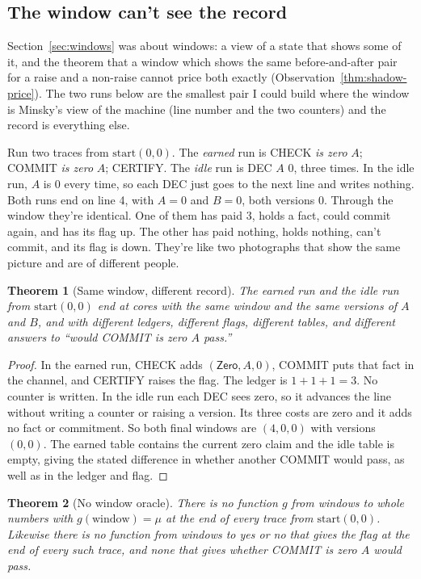 \documentclass[11pt,twoside]{article}
\theoremstyle{thielethm}
\newtheorem{theorem}{Theorem}[section]
\theoremstyle{thieledef}
\theoremstyle{thieledef}
\theoremstyle{thieledef}
\theoremstyle{thielethm}
\theoremstyle{thieleobs}
\theoremstyle{thielethm}
\begin{document}
\subsection{The window can't see the record}

Section~\ref{sec:windows} was about windows: a view of a state that shows some of it, and the theorem that a window
which shows the same before-and-after pair for a raise and a non-raise cannot price both exactly
(Observation~\ref{thm:shadow-price}). The two runs below are the smallest pair I could build where the window is
Minsky's view of the machine (line number and the two counters) and the record is
everything else.

Run two traces from $\mathrm{start}(0, 0)$. The \emph{earned} run is CHECK \emph{is zero} $A$; COMMIT
\emph{is zero} $A$; CERTIFY. The \emph{idle} run is DEC $A$ 0, three times. In the idle run, $A$ is 0
every time, so each DEC just goes to the next line and writes nothing. Both runs end on line
4, with $A = 0$ and $B = 0$, both versions 0. Through the window they're identical. One of them has
paid 3, holds a fact, could commit again, and has its flag up. The other has paid nothing,
holds nothing, can't commit, and its flag is down. They're like two photographs that show the
same picture and are of different people.

\begin{theorem}[Same window, different record]\label{thm:u34-separation}
The earned run and the idle run from $\mathrm{start}(0, 0)$ end at cores with the same
window and the same versions of $A$ and $B$, and with different ledgers, different flags,
different tables, and different answers to ``would COMMIT \emph{is zero} $A$ pass.''
\end{theorem}

\begin{proof}
In the earned run, CHECK adds $(\mathsf{Zero},A,0)$, COMMIT puts that fact in the
channel, and CERTIFY raises the flag. The ledger is $1+1+1=3$. No counter is written.
In the idle run each DEC sees zero, so it advances the line without writing a counter
or raising a version. Its three costs are zero and it adds no fact or commitment.
So both final windows are $(4,0,0)$ with versions $(0,0)$. The earned table contains
the current zero claim and the idle table is empty, giving the stated difference in
whether another COMMIT would pass, as well as in the ledger and flag.
\end{proof}

\begin{theorem}[No window oracle]\label{thm:u34-no-oracle}
There is no function $g$ from windows to whole numbers with $g(\mathrm{window}) = \mu$ at the
end of every trace from $\mathrm{start}(0, 0)$. Likewise there is no function from windows to
yes or no that gives the flag at the end of every such trace, and none that gives whether
COMMIT \emph{is zero} $A$ would pass.
\end{theorem}
\end{document}
